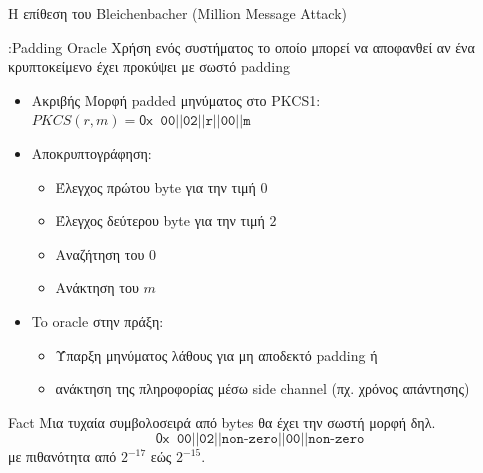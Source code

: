 \documentclass[handout]{beamer}
\begin{document}
\begin{frame}[allowframebreaks]{Η επίθεση του Bleichenbacher (Million Message Attack)}

\begin{block}{:Padding Oracle}
Χρήση ενός συστήματος το οποίο μπορεί να αποφανθεί αν ένα κρυπτοκείμενο έχει προκύψει με σωστό padding
\end{block}

\begin{itemize}
\item Ακριβής Μορφή padded μηνύματος στο PKCS1: $PKCS(r,m)= \mathsf{0x} \;\; \mathtt{ 00 || 02 || r || 00 || m}$
\item Αποκρυπτογράφηση: 
\begin{itemize}
\item Έλεγχος πρώτου byte για την τιμή $0$
\item Έλεγχος δεύτερου byte για την τιμή $2$
\item Αναζήτηση του $0$ 
\item Ανάκτηση του $m$
\end{itemize}
\framebreak
\item To oracle στην πράξη:
\begin{itemize} 
\item Ύπαρξη μηνύματος λάθους για μη αποδεκτό padding ή 
\item ανάκτηση της πληροφορίας μέσω side channel (πχ. χρόνος απάντησης)
\end{itemize}
\end{itemize}

\begin{block}{Fact}
Μια τυχαία συμβολοσειρά από bytes θα έχει την σωστή μορφή δηλ. 
$$\mathsf{0x} \;\; \mathtt{ 00 || 02 || \text{non-zero} || 00 || \text{non-zero}}$$
με πιθανότητα από $2^{-17}$ εώς $2^{-15}$.
\end{block}


\end{frame}
\end{document}
